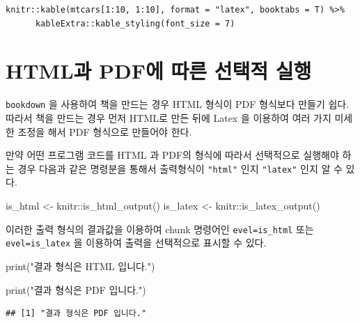 \documentclass[
]{book}
\newenvironment{Shaded}{\begin{snugshade}}{\end{snugshade}}
\newcommand{\FunctionTok}[1]{\textcolor[rgb]{0.00,0.00,0.00}{#1}}
\newcommand{\NormalTok}[1]{#1}
\newcommand{\OtherTok}[1]{\textcolor[rgb]{0.56,0.35,0.01}{#1}}
\newcommand{\SpecialCharTok}[1]{\textcolor[rgb]{0.00,0.00,0.00}{#1}}
\newcommand{\StringTok}[1]{\textcolor[rgb]{0.31,0.60,0.02}{#1}}
\theoremstyle{definition}
\theoremstyle{definition}
\theoremstyle{definition}
\theoremstyle{definition}
\theoremstyle{remark}
\begin{document}
\begin{verbatim}
knitr::kable(mtcars[1:10, 1:10], format = "latex", booktabs = T) %>%
      kableExtra::kable_styling(font_size = 7) 
\end{verbatim}

\hypertarget{htmluxacfc-pdfuxc5d0-uxb530uxb978-uxc120uxd0dduxc801-uxc2e4uxd589}{%
\section{HTML과 PDF에 따른 선택적 실행}\label{htmluxacfc-pdfuxc5d0-uxb530uxb978-uxc120uxd0dduxc801-uxc2e4uxd589}}

\texttt{bookdown} 을 사용하여 책을 만드는 경우 HTML 형식이 PDF 형식보다 만들기 쉽다. 따라서 책을 만드는 경우 먼저 HTML로 만든 뒤에 Latex 을 이용하여 여러 가지 미세한 조정을 해서 PDF 형식으로 만들어야 한다.

만약 어떤 프로그램 코드를 HTML 과 PDF의 형식에 따라서 선택적으로 실행해야 하는 경우
다음과 같은 명령분을 통해서 출력형식이 \texttt{"html"} 인지 \texttt{"latex"} 인지 알 수 있다.

\begin{Shaded}
\begin{Highlighting}[]
\NormalTok{is\_html }\OtherTok{\textless{}{-}}\NormalTok{ knitr}\SpecialCharTok{::}\FunctionTok{is\_html\_output}\NormalTok{()}
\NormalTok{is\_latex }\OtherTok{\textless{}{-}}\NormalTok{ knitr}\SpecialCharTok{::}\FunctionTok{is\_latex\_output}\NormalTok{()}
\end{Highlighting}
\end{Shaded}

이러한 출력 형식의 결과값을 이용하여 chunk 명령어인 \texttt{evel=is\_html} 또는 \texttt{evel=is\_latex} 을 이용하여
출력을 선택적으로 표시할 수 있다.

\begin{Shaded}
\begin{Highlighting}[]
\FunctionTok{print}\NormalTok{(}\StringTok{"결과 형식은 HTML 입니다."}\NormalTok{)}
\end{Highlighting}
\end{Shaded}

\begin{Shaded}
\begin{Highlighting}[]
\FunctionTok{print}\NormalTok{(}\StringTok{"결과 형식은 PDF 입니다."}\NormalTok{)}
\end{Highlighting}
\end{Shaded}

\begin{verbatim}
## [1] "결과 형식은 PDF 입니다."
\end{verbatim}
\end{document}
